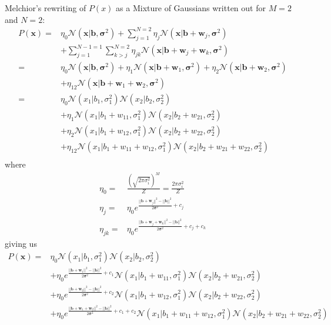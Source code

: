 \documentclass[twoside,english]{uiofysmaster}
\begin{document}
Melchior's rewriting of $P(x)$ as a Mixture of Gaussians written out for $M=2$ and $N=2$:
\begin{align}
	P(\bm{x}) =& \eta_0 \mathcal{N}(\bm{x}|\bm{b}, \bm{\sigma}^2)
	+ \sum_{j=1}^{N=2} \eta_j \mathcal{N} (\bm{x}| \bm{b} + \bm{w}_j, \bm{\sigma}^2) \nonumber \\
	&+ \sum_{j=1}^{N-1=1} \sum_{k>j}^{N=2} \eta_{jk} \mathcal{N} (\bm{x}|\bm{b}+\bm{w}_j + \bm{w}_k, \bm{\sigma}^2) \\
	=& \eta_0 \mathcal{N}(\bm{x}|\bm{b}, \bm{\sigma}^2)
	+ \eta_1 \mathcal{N} (\bm{x}| \bm{b} + \bm{w}_1, \bm{\sigma}^2)
	+ \eta_2 \mathcal{N} (\bm{x}| \bm{b} + \bm{w}_2, \bm{\sigma}^2) \nonumber \\
	&+ \eta_{12} \mathcal{N} (\bm{x}|\bm{b}+\bm{w}_1 + \bm{w}_2, \bm{\sigma}^2) \\
	=& \eta_0 \mathcal{N}(x_1|b_1, \sigma_1^2)\mathcal{N}(x_2|b_2, \sigma_2^2) \nonumber \\
	&+ \eta_1 \mathcal{N} (x_1| b_1 + w_{11}, \sigma_1^2)\mathcal{N} (x_2| b_2 + w_{21}, \sigma_2^2) \nonumber \\
	&+ \eta_2 \mathcal{N} (x_1| b_1 + w_{12}, \sigma_1^2) \mathcal{N} (x_2| b_2 + w_{22}, \sigma_2^2) \nonumber \\
	&+ \eta_{12} \mathcal{N} (x_1|b_1+ w_{11} + w_{12}, \sigma_1^2) \mathcal{N} (x_2|b_2+ w_{21} + w_{22}, \sigma_2^2) \\
\end{align}
where
\begin{align}
	\eta_0 =& \frac{(\sqrt{2\pi \sigma_i^2})^M}{Z} =  \frac{2\pi \sigma_i^2}{Z} \\
	\eta_j =& \eta_0 e^{\frac{||\bm{b} + \bm{w}_j||^2 - ||\bm{b}||^2}{2\bm{\sigma}^2} + c_j} \\
	\eta_{jk} =& \eta_0 e^{\frac{||\bm{b} + \bm{w}_j + \bm{w}_k||^2 - ||\bm{b}||^2}{2\bm{\sigma}^2} + c_j + c_k}
\end{align}
giving us
\begin{align}
	P(\bm{x}) =& \eta_0 \mathcal{N}(x_1|b_1, \sigma_1^2)\mathcal{N}(x_2|b_2, \sigma_2^2) \nonumber \\
	&+ \eta_0 e^{\frac{||\bm{b} + \bm{w}_1||^2 - ||\bm{b}||^2}{2\bm{\sigma}^2} + c_1}
	\mathcal{N} (x_1| b_1 + w_{11}, \sigma_1^2)\mathcal{N} (x_2| b_2 + w_{21}, \sigma_2^2) \nonumber \\
	&+ \eta_0 e^{\frac{||\bm{b} + \bm{w}_2||^2 - ||\bm{b}||^2}{2\bm{\sigma}^2} + c_2}
	 \mathcal{N} (x_1| b_1 + w_{12}, \sigma_1^2) \mathcal{N} (x_2| b_2 + w_{22}, \sigma_2^2) \nonumber \\
	&+ \eta_0 e^{\frac{||\bm{b} + \bm{w}_1 + \bm{w}_2||^2 - ||\bm{b}||^2}{2\bm{\sigma}^2} + c_1 + c_2}
	 \mathcal{N} (x_1|b_1+ w_{11} + w_{12}, \sigma_1^2) \mathcal{N} (x_2|b_2+ w_{21} + w_{22}, \sigma_2^2)  \\
\end{align}
\end{document}
